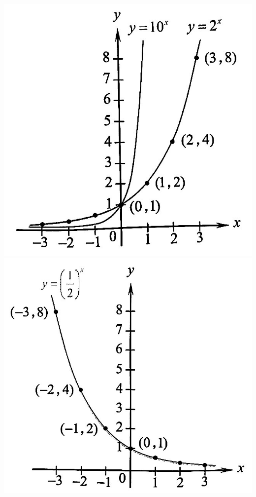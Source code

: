 \documentclass[12pt]{report}
\begin{document}
\begin{center}
    \includegraphics[scale=0.3]{./assets/expo1.jpeg}
    \hspace{1cm}
    \includegraphics[scale=0.3]{./assets/expo2.jpeg}
\end{center}
\end{document}
